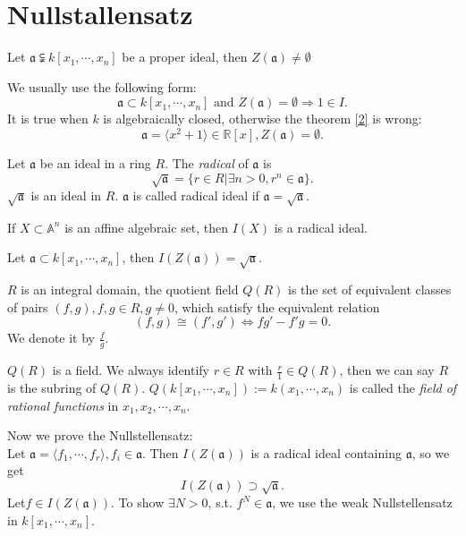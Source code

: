\section{Nullstallensatz}
\begin{theorem}\label{2}
	Let $ \mathfrak{a}\subsetneqq k[x_1,\cdots,x_n] $ be a proper ideal, then $ Z(\mathfrak{a})\neq \emptyset $
\end{theorem}
\begin{remark}
	We usually use the following form:
	$$
		\mathfrak{a}\subset k[x_1,\cdots,x_n] \text{ and } Z(\mathfrak{a})=\emptyset\Rightarrow 1\in I.
	$$
	It is true when $ k $ is algebraically closed, otherwise the theorem \ref{2} is wrong:
	$$
		\mathfrak{a}=\langle x^2+1\rangle \in \mathbb{R}[x], Z(\mathfrak{a})=\emptyset.
	$$
\end{remark}
\begin{definition}
	Let $ \mathfrak{a} $ be an ideal in a ring $ R $. The \textit{radical} of $ \mathfrak{a} $ is
	$$
		\sqrt{\mathfrak{a}}=\{ r\in R|\exists n>0, r^n\in \mathfrak{a} \}.
	$$
	$ \sqrt{\mathfrak{a}} $ is an ideal in $ R $.
	$ \mathfrak{a} $ is called radical ideal if $ \mathfrak{a}=\sqrt{\mathfrak{a}} $.
\end{definition}
\begin{remark}
	If $ X\subset \mathbb{A}^n $ is an affine algebraic set, then $ I(X) $ is a radical ideal.
\end{remark}

\begin{theorem}[Nullstallensatz]
	Let $ \mathfrak{a}\subset k[x_1,\cdots,x_n] $, then $ I(Z(\mathfrak{a}))=\sqrt{\mathfrak{a}} $.
\end{theorem}
\begin{definition}
	$ R $ is an integral domain, the quotient field $ Q(R) $ is the set of equivalent classes of pairs $ (f,g), f,g\in R, g\neq 0 $, which satisfy the equivalent relation
	$$
		(f,g)\cong (f',g') \Leftrightarrow fg'-f'g=0.
	$$
	We denote it by $ \frac{f}{g} $.
\end{definition}
\begin{remark}
	$ Q(R) $ is a field. We always identify $ r\in R $ with $ \frac{r}{1}\in Q(R) $, then we can say $ R $ is the subring of $ Q(R) $. $ Q(k[x_1,\cdots,x_n]):=k(x_1,\cdots,x_n) $ is called the \textit{field of rational functions} in $ x_1,x_2,\cdots,x_n $.
\end{remark}
Now we prove the Nullstellensatz:\\
	Let $ \mathfrak{a} = \langle f_1,\cdots, f_r\rangle, f_i\in \mathfrak{a} $. Then $ I(Z(\mathfrak{a}))  $ is a radical ideal containing $ \mathfrak{a} $, so we get
	$$
		I(Z(\mathfrak{a}))\supset \sqrt{\mathfrak{a}}.
	$$
	Let$ f\in I(Z(\mathfrak{a})) $. To show $ \exists N>0 $, s.t. $ f^N\in \mathfrak{a} $, we use the weak Nullstellensatz in $ k[x_1,\cdots,x_n] $.

